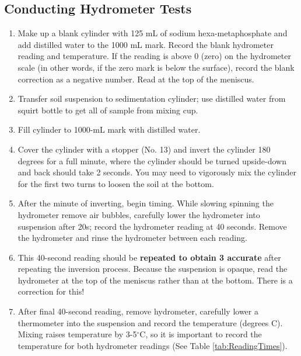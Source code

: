 \documentclass[12pt]{../SOP3_alpha}
\begin{document}
\subsection{Conducting Hydrometer Tests}

\begin{enumerate}

	\item Make up a blank cylinder with 125 mL of sodium hexa-metaphosphate and add distilled water to the 1000 mL mark.  Record the blank hydrometer reading and temperature. If the reading is above 0 (zero) on the hydrometer scale (in other words, if the zero mark is below the surface), record the blank correction as a negative number.  Read at the top of the meniscus.
	
	\item Transfer soil suspension to sedimentation cylinder; use distilled water from squirt bottle to get all of sample from mixing cup.

	\item Fill cylinder to 1000-mL mark with distilled water.

	\item Cover the cylinder with a stopper (No. 13) and invert the cylinder 180 degrees for a full minute, where the cylinder should be turned upside-down and back should take 2 seconds. You may need to vigorously mix the cylinder for the first two turns to loosen the soil at the bottom.
	
	\item After the minute of inverting, begin timing.  While slowing spinning the hydrometer remove air bubbles, carefully lower the hydrometer into suspension after 20s; record the hydrometer reading at 40 seconds. Remove the hydrometer and rinse the hydrometer between each reading. 
	
	\item This 40-second reading should be \textbf{repeated to obtain 3 accurate} after repeating the inversion process. Because the suspension is opaque, read the hydrometer at the top of the meniscus rather than at the bottom. There is a correction for this!

	\item After final 40-second reading, remove hydrometer, carefully lower a thermometer into the suspension and record the temperature (degrees C).  Mixing raises temperature by 3-5$^\circ$C, so it is important to record the temperature for both hydrometer readings (See Table \ref{tab:ReadingTimes}).
	

\end{enumerate}
\end{document}
